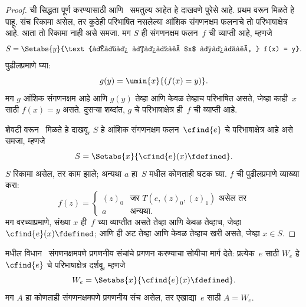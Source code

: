 \documentclass[../../../include/open-logic-section]{subfiles}
\begin{document}
\begin{proof}
 ची सिद्धता पूर्ण करण्यासाठी
 आणि~ समतुल्य आहेत
हे दाखवणे पुरेसे आहे. प्रथम  वरून
 मिळते हे पाहू. संच रिकामा असेल,
तर कुठेही परिभाषित नसलेल्या आंशिक संगणनक्षम फलनाचे तो
परिभाषाक्षेत्र आहे. आता तो रिकामा नाही असे समजा. मग
$S$ ही संगणनक्षम फलन~$f$ ची व्याप्ती आहे, म्हणजे
\[
S = \Setabs{y}{\text{अशा काही $x$ साठी, } f(x) = y}.
\]
पुढीलप्रमाणे घ्या:
\[
g(y) = \umin{x}{(f(x) = y)}.
\]
मग $g$ आंशिक संगणनक्षम आहे आणि $g(y)$ तेव्हा आणि केवळ तेव्हाच
परिभाषित असते, जेव्हा काही~$x$ साठी $f(x) = y$ असते. दुसऱ्या शब्दांत, $g$
चे परिभाषाक्षेत्र ही~$f$ ची व्याप्ती आहे.

शेवटी  वरून~ मिळते
हे दाखवू. $S$ हे आंशिक संगणनक्षम फलन~$\cfind{e}$ चे
परिभाषाक्षेत्र आहे असे समजा, म्हणजे
\[
S = \Setabs{x}{\cfind{e}(x) \fdefined}.
\]
$S$ रिकामा असेल, तर काम झाले; अन्यथा $a$ हा~$S$
मधील कोणताही घटक घ्या. $f$ ची पुढीलप्रमाणे व्याख्या करा:
\[
f(z) = \begin{cases}
(z)_0 & \text{जर $T(e,(z)_0,(z)_1)$ असेल तर} \\
a & \text{अन्यथा.}
\end{cases}
\]
मग वरच्याप्रमाणे, संख्या $x$ ही~$f$ च्या व्याप्तीत असते तेव्हा आणि
केवळ तेव्हाच, जेव्हा $\cfind{e}(x) \fdefined$; आणि ही अट तेव्हा आणि
केवळ तेव्हाच खरी असते, जेव्हा $x \in S$.
\end{proof}

 मधील विधान~
संगणनक्षमपणे प्रगणनीय संचांचे प्रगणन करण्याचा सोयीचा मार्ग देते:
प्रत्येक~$e$ साठी $W_e$ हे $\cfind{e}$ चे परिभाषाक्षेत्र दर्शवू,
म्हणजे
\[
W_e = \Setabs{x}{\cfind{e}(x) \fdefined}.
\]
मग $A$ हा कोणताही संगणनक्षमपणे प्रगणनीय संच असेल, तर
एखाद्या~$e$ साठी $A = W_e$.
\end{document}
